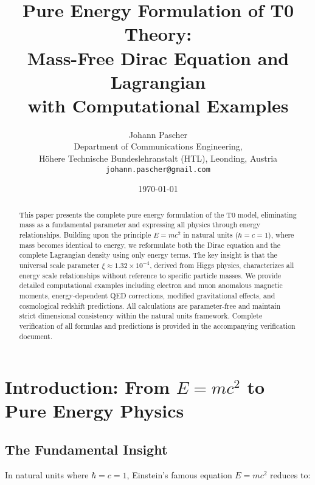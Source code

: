 \documentclass[12pt,a4paper]{article}
\begin{document}
	
	\title{Pure Energy Formulation of T0 Theory: \\
		Mass-Free Dirac Equation and Lagrangian \\
		with Computational Examples}
	\author{Johann Pascher\\
		Department of Communications Engineering, \\H\"ohere Technische Bundeslehranstalt (HTL), Leonding, Austria\\
		\texttt{johann.pascher@gmail.com}}
	\date{\today}
	
	\maketitle
	
	\begin{abstract}
		This paper presents the complete pure energy formulation of the T0 model, eliminating mass as a fundamental parameter and expressing all physics through energy relationships. Building upon the principle $E = mc^2$ in natural units ($\hbar = c = 1$), where mass becomes identical to energy, we reformulate both the Dirac equation and the complete Lagrangian density using only energy terms. The key insight is that the universal scale parameter $\xi \approx 1.32 \times 10^{-4}$, derived from Higgs physics, characterizes all energy scale relationships without reference to specific particle masses. We provide detailed computational examples including electron and muon anomalous magnetic moments, energy-dependent QED corrections, modified gravitational effects, and cosmological redshift predictions. All calculations are parameter-free and maintain strict dimensional consistency within the natural units framework.
		Complete verification of all formulas and predictions is provided in the accompanying verification document.
	\end{abstract}
	
	\tableofcontents
	\newpage
	
	\section{Introduction: From $E = mc^2$ to Pure Energy Physics}
	\label{sec:introduction}
	
	\subsection{The Fundamental Insight}
	\label{subsec:fundamental_insight}
	
	In natural units where $\hbar = c = 1$, Einstein's famous equation $E = mc^2$ reduces to:
	
\end{document}
